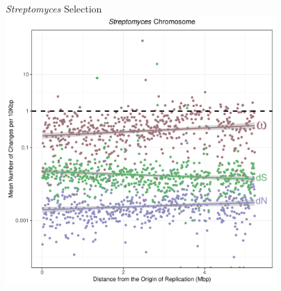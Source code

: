 \documentclass{beamer}
\newcommand{\strep}{\textit{Streptomyces}\xspace}
\begin{document}
\begin{frame}{\strep Selection}
	\centering
	\includegraphics[width=0.77\textwidth]{strep_selection.pdf}
\end{frame}
\end{document}
